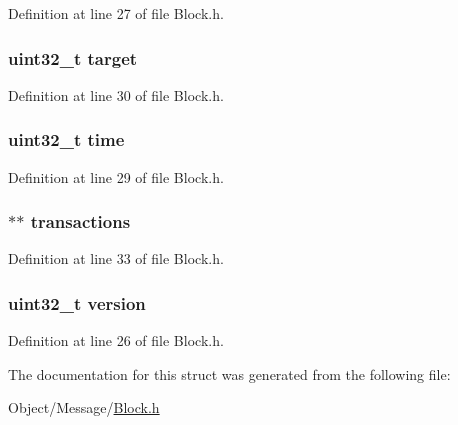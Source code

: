 Definition at line 27 of file Block.h.

\hypertarget{struct_m_i_block_a695e5800ad1fd403c0e72d918eaec97c}{
\subsubsection[{target}]{\setlength{\rightskip}{0pt plus 5cm}uint32\_\-t {\bf target}}}
\label{struct_m_i_block_a695e5800ad1fd403c0e72d918eaec97c}


Definition at line 30 of file Block.h.

\hypertarget{struct_m_i_block_ae73654f333e4363463ad8c594eca1905}{
\subsubsection[{time}]{\setlength{\rightskip}{0pt plus 5cm}uint32\_\-t {\bf time}}}
\label{struct_m_i_block_ae73654f333e4363463ad8c594eca1905}


Definition at line 29 of file Block.h.

\hypertarget{struct_m_i_block_a722f3f2bbe4a11072741a214e2750a42}{
\subsubsection[{transactions}]{$\ast$$\ast$ {\bf transactions}}}
\label{struct_m_i_block_a722f3f2bbe4a11072741a214e2750a42}


Definition at line 33 of file Block.h.

\hypertarget{struct_m_i_block_acd99bb05ca015e7d74448acb1deba7ca}{
\subsubsection[{version}]{\setlength{\rightskip}{0pt plus 5cm}uint32\_\-t {\bf version}}}
\label{struct_m_i_block_acd99bb05ca015e7d74448acb1deba7ca}


Definition at line 26 of file Block.h.



The documentation for this struct was generated from the following file:\begin{DoxyCompactItemize}
\item 
Object/Message/\hyperlink{_m_i_block_8h}{Block.h}\end{DoxyCompactItemize}
